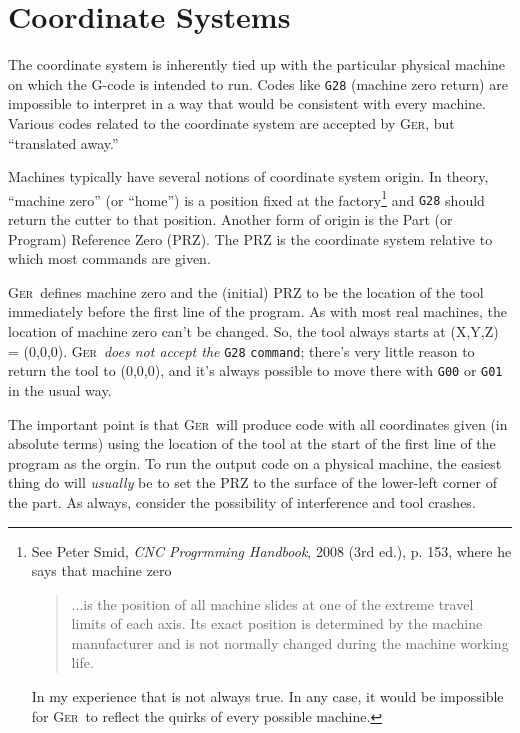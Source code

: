 \documentclass[titlepage,oneside,10pt]{article}
\newcommand{\ger}{\textsc{Ger}}
\begin{document}
\raggedbottom

\newcommand{\mymargin}[1]{\marginpar{\rm\tiny #1}}
\newcommand{\leftmar}[1]{\reversemarginpar \mymargin{#1}}


\section{Coordinate Systems}

The coordinate system is inherently tied up with the particular
physical machine on which the G-code is intended to run. Codes like
{\tt G28} (machine zero return) are impossible to interpret in a way
that would be consistent with every machine. Various codes related to
the coordinate system are accepted by \ger, but ``translated away.''

Machines typically have several notions of coordinate system
origin. In theory, ``machine zero'' (or ``home'') is a 
position fixed at the factory\footnote{See Peter
Smid, \emph{CNC Progrmming Handbook}, 2008 (3rd ed.), p. 153, where he
says that machine zero
\begin{quote}
  ...is the position of all machine slides at one of the extreme
  travel limits of each axis. Its exact position is determined by the
  machine manufacturer and is not normally changed during the machine
  working life.
  \end{quote}
In my experience that is not always true. In any case, it would be
impossible for \ger\ to reflect the quirks of every possible machine. }
and {\tt G28} should return the cutter to that position. Another form
of origin is the Part (or Program) Reference Zero (PRZ). The PRZ is
the coordinate system relative to which most commands are given.

\ger\ defines machine zero and the (initial) PRZ to be the location of
the tool immediately before the first line of the program. As with
most real machines, the location of machine zero can't be changed. So,
the tool always starts at (X,Y,Z) = (0,0,0). \ger\ \emph{does not
accept the} {\tt G28} {\tt command}; there's very little reason to
return the tool to (0,0,0), and it's always possible to move there
with {\tt G00} or {\tt G01} in the usual way.

The important point is that \ger\ will produce code with all coordinates
given (in absolute terms) using the location of the tool at the start
of the first line of the program as the orgin. To run the output code
on a physical machine, the easiest thing do will {\it usually} be to
set the PRZ to the surface of the lower-left corner of the part. As
always, consider the possibility of interference and tool crashes.
\end{document}

